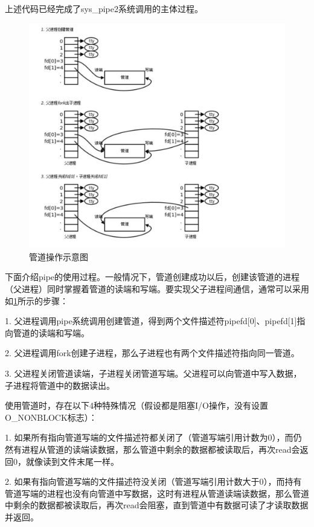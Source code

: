 上述代码已经完成了sys_pipe2系统调用的主体过程。

\begin{figure}[htb]
    \centering
    \includegraphics[width=\textwidth]{figures/07-09-管道操作示意图.png}
    \caption{
        管道操作示意图
    }
    \label{fig:pipe}
\end{figure}

下面介绍pipe的使用过程。一般情况下，管道创建成功以后，创建该管道的进程（父进程）同时掌握着管道的读端和写端。要实现父子进程间通信，通常可以采用如\ref{fig:pipe}所示的步骤：

1. 父进程调用pipe系统调用创建管道，得到两个文件描述符pipefd[0]、pipefd[1]指向管道的读端和写端。

2. 父进程调用fork创建子进程，那么子进程也有两个文件描述符指向同一管道。

3. 父进程关闭管道读端，子进程关闭管道写端。父进程可以向管道中写入数据，子进程将管道中的数据读出。

使用管道时，存在以下4种特殊情况（假设都是阻塞I/O操作，没有设置O_NONBLOCK标志）：

1. 如果所有指向管道写端的文件描述符都关闭了（管道写端引用计数为0），而仍然有进程从管道的读端读数据，那么管道中剩余的数据都被读取后，再次read会返回0，就像读到文件末尾一样。

2. 如果有指向管道写端的文件描述符没关闭（管道写端引用计数大于0），而持有管道写端的进程也没有向管道中写数据，这时有进程从管道读端读数据，那么管道中剩余的数据都被读取后，再次read会阻塞，直到管道中有数据可读了才读取数据并返回。


